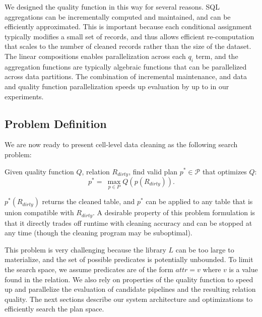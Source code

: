 We designed the quality function in this way for several reasons.  SQL aggregations can be incrementally computed and maintained, and can be efficiently approximated.  This is important because each conditional assignment typically modifies a small set of records, and thus allows efficient re-computation that scales to the number of cleaned records rather than the size of the dataset.  The linear compositions enables parallelization across each $q_i$ term, and the aggregation functions are typically algebraic functions that can be parallelized across data partitions.  The combination of incremental maintenance, and data and quality function parallelization speeds up evaluation by up to  in our experiments.





\subsection{Problem Definition}
We are now ready to present cell-level data cleaning as the following search problem:
\begin{problem}%
Given quality function $Q$, relation $R_{dirty}$, find valid plan $p^* \in \mathcal{P}$ that optimizes $Q$:
\[
p^* = ~ \max_{p \in P} Q( p(R_{dirty}) ).  
\]
\end{problem}
$p^*(R_{dirty})$ returns the cleaned table, and $p^*$ can be applied to any table that is union compatible with $R_{dirty}$.  A desirable property of this problem formulation is that it directly trades off runtime with cleaning accuracy and can be stopped at any time (though the cleaning program may be suboptimal).

This problem is very challenging because the library $L$ can be too large to materialize, and the set of possible predicates is potentially unbounded.  To limit the search space, we assume predicates are of the form $attr = v$ where $v$ is a value found in the relation.  We also rely on properties of the quality function to speed up and parallelize the evaluation of candidate pipelines and the resulting relation quality.   The next sections describe our system architecture and optimizations to efficiently search the plan space.



